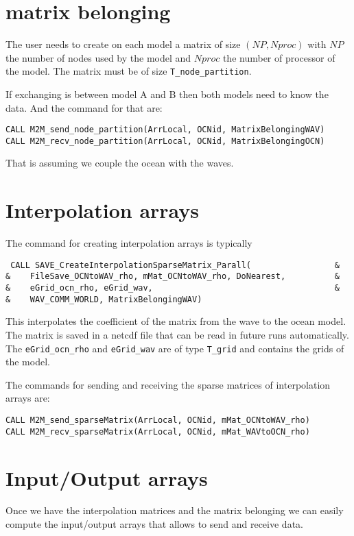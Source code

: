 \documentclass[12pt]{article}
\begin{document}
\section{matrix belonging}

The user needs to create on each model a matrix of size $(NP, Nproc)$ with $NP$ the number of nodes used by the model and $Nproc$ the number of processor of the model. The matrix must be of size {\tt T\_node\_partition}.

If exchanging is between model A and B then both models need to know the data. And the command for that are:
\begin{verbatim}
CALL M2M_send_node_partition(ArrLocal, OCNid, MatrixBelongingWAV)
CALL M2M_recv_node_partition(ArrLocal, OCNid, MatrixBelongingOCN)
\end{verbatim}
That is assuming we couple the ocean with the waves.



\section{Interpolation arrays}

The command for creating interpolation arrays is typically

\begin{verbatim}
 CALL SAVE_CreateInterpolationSparseMatrix_Parall(                 &
&    FileSave_OCNtoWAV_rho, mMat_OCNtoWAV_rho, DoNearest,          &
&    eGrid_ocn_rho, eGrid_wav,                                     &
&    WAV_COMM_WORLD, MatrixBelongingWAV)
\end{verbatim}
This interpolates the coefficient of the matrix from the wave to the ocean model.
The matrix is saved in a netcdf file that can be read in future runs automatically.
The {\tt eGrid\_ocn\_rho} and {\tt eGrid\_wav} are of type {\tt T\_grid} and contains
the grids of the model.


The commands for sending and receiving the sparse matrices of interpolation arrays
are:
\begin{verbatim}
CALL M2M_send_sparseMatrix(ArrLocal, OCNid, mMat_OCNtoWAV_rho)
CALL M2M_recv_sparseMatrix(ArrLocal, OCNid, mMat_WAVtoOCN_rho)
\end{verbatim}


\section{Input/Output arrays}
Once we have the interpolation matrices and the matrix belonging we can easily compute
the input/output arrays that allows to send and receive data.
\end{document}
